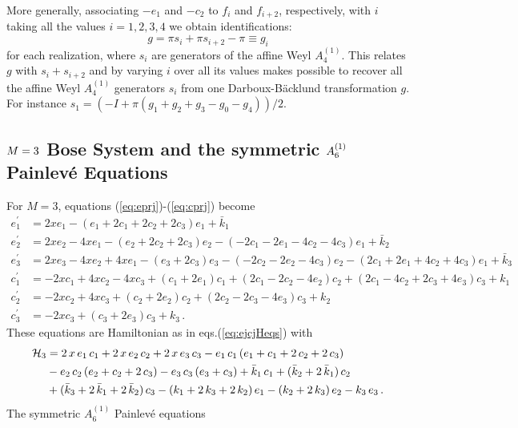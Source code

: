 \documentclass[12pt]{article}
\numberwithin{equation}{section}
\def\rf#1{(\ref{eq:#1})}
\def\lab#1{\label{eq:#1}}
\begin{document}
More generally, associating $-e_1$ and $-c_2$ to $f_i$ and $f_{i+2}$, respectively, with
$i$ taking all the values $i=1,2,3,4$ we obtain identifications:
\[
g = \pi s_i+\pi s_{i+2}-\pi \equiv g_i
\]
for each realization, where
$s_i$ are  generators of the affine Weyl $A^{(1)}_4$. 
This relates $g$ with $s_i+ s_{i+2}$ and by varying $i$ over all its
values makes possible to recover all the affine Weyl $A^{(1)}_4$ generators $s_i$ from one 
Darboux-B\"acklund transformation $g$.
For instance $s_1=(-I+\pi(g_1+g_2+g_3-g_0-g_4))/2$.

\subsection{$\boldmath{M=3}$ Bose System and the symmetric $\boldmath{A^{(1)}_6}$  Painlev\'e Equations}
For $M=3$,  equations \rf{eprj}-\rf{cprj} become
\begin{equation}
\begin{split}
e_1^\prime&=2xe_1-(e_1+2c_1+2c_2+2c_3)e_1+{\bar k}_1\\
e_2^\prime&=2xe_2-4xe_1-(e_2+2c_2+2c_3)e_2-(-2c_1-2e_1-
4c_2-4c_3)e_1+{\bar k}_2\\
e_3^\prime&=2xe_3-4xe_2+4xe_1-(e_3+2c_3)e_3-(-2c_2-2e_2-4c_3)e_2
-(2c_1+2e_1+4c_2+4c_3)e_1+{\bar k}_3\\
c_1^\prime &= -2xc_1+4xc_2-4xc_3+(c_1+2e_1)c_1+
(2c_1-2c_2-4e_2)c_2+(2c_1-4c_2+2c_3+4e_3)c_3+k_1\\
c_2^\prime&=-2xc_2+4xc_3+(c_2+2e_2)c_2+(2c_2-2c_3-4e_3)c_3+k_2\\
c_3^\prime&=-2xc_3+(c_3+2e_3)c_3+k_3\, .
\lab{M3-eqs}
\end{split}
\end{equation}
These equations are Hamiltonian as in eqs.\rf{ejcjHeqs} 
with
\begin{equation}
\begin{split}
{\cal H}_3 &= 2\,x\,{e_1}\,{c_1} + 2\,x\,{e_2}
\,{c_2} + 2\,x\,{e_3}\,{c_3} - {e_1}\,
{c_1}\,({e_1} + {c_1} + 2\,{c_2} + 2\,
{c_3}) \\
&- {e_2}\,{c_2}\,({e_2} + {c_2} + 
2\,{c_3}) - {e_3}\,{c_3}\,({e_3} + 
{c_3}) + {{\bar k}_1}\,{c_1} + ({{\bar k}_2} + 2\,
{{\bar k}_1})\,{c_2} \\
&+ ({{\bar k}_3} + 2\,{{\bar k}_1} + 2\,{{\bar k}_2})\,
{c_3} - ({k_1} + 2\,{k_3} + 2\,{k_2})\,
{e_1} - ({k_2} + 2\,{k_3})\,{e_2} - 
{k_3}\,{e_3}\, . 
\end{split}
\lab{6boseham}
\end{equation}
The symmetric $A^{(1)}_6$  Painlev\'e equations
\end{document}
